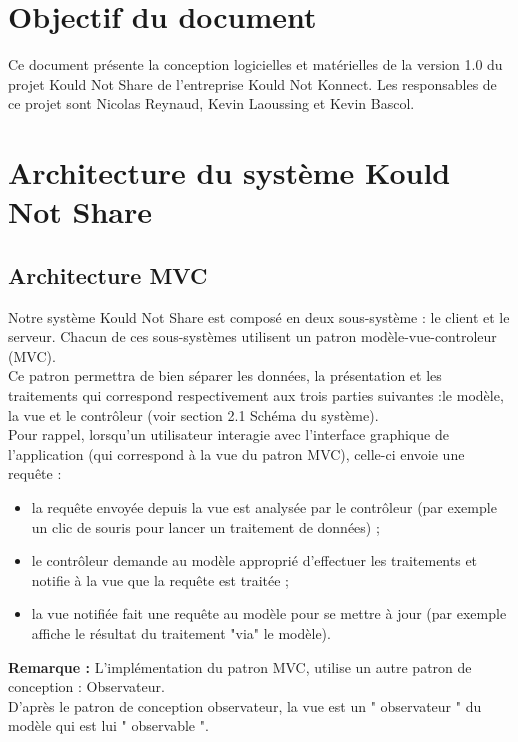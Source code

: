 \documentclass[10pt,a4paper]{report}
\begin{document}



\section{Objectif du document}
\begin{flushleft}
Ce document présente la conception logicielles et matérielles de la version 1.0 du projet Kould Not Share de l'entreprise Kould Not Konnect. Les responsables de ce projet sont Nicolas Reynaud, Kevin Laoussing et Kevin Bascol.
\end{flushleft}

\section{Architecture du système Kould Not Share}

	\subsection{Architecture MVC}
		\begin{flushleft}
		Notre système Kould Not Share est composé en deux sous-système : le client et le serveur. Chacun de ces sous-systèmes utilisent un patron modèle-vue-controleur (MVC).\\
Ce patron permettra de bien séparer les données, la présentation et les traitements qui correspond respectivement aux trois parties suivantes :le modèle, la vue et le contrôleur (voir section 2.1 Schéma du système).\\
Pour rappel, lorsqu'un utilisateur interagie avec l'interface graphique de l'application (qui correspond à la vue du patron MVC), celle-ci envoie une requête  :
			\begin{itemize}
				\item la requête envoyée depuis la vue est analysée par le contrôleur (par exemple un clic de souris pour lancer un traitement de données) ;
    			\item le contrôleur demande au modèle approprié d'effectuer les traitements et notifie à la vue que la requête est traitée ;
    			\item la vue notifiée fait une requête au modèle pour se mettre à jour (par exemple affiche le résultat du traitement "via" le modèle).

			\end{itemize}
		\textbf{Remarque : }L'implémentation du patron MVC, utilise un autre patron de conception : Observateur.\\
D'après le patron de conception observateur, la vue est un " observateur " du modèle qui est lui " observable ".
		\end{flushleft}
    
\end{document}
